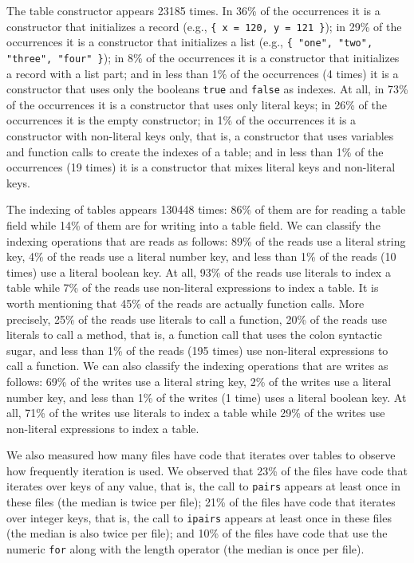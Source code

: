 The table constructor appears 23185 times.
In 36\% of the occurrences it is a constructor that initializes a
record (e.g., \texttt{\{ x = 120, y = 121 \}});
in 29\% of the occurrences it is a constructor that initializes a
list (e.g., \texttt{\{ "one", "two", "three", "four" \}});
in 8\% of the occurrences it is a constructor that initializes a
record with a list part;
and in less than 1\% of the occurrences (4 times) it is a constructor
that uses only the booleans \texttt{true} and \texttt{false} as indexes.
At all, in 73\% of the occurrences it is a constructor that uses
only literal keys;
in 26\% of the occurrences it is the empty constructor;
in 1\% of the occurrences it is a constructor with non-literal keys
only, that is, a constructor that uses variables and function calls
to create the indexes of a table;
and in less than 1\% of the occurrences (19 times) it is a constructor
that mixes literal keys and non-literal keys.

The indexing of tables appears 130448 times:
86\% of them are for reading a table field while
14\% of them are for writing into a table field.
We can classify the indexing operations that are reads as follows:
89\% of the reads use a literal string key,
4\% of the reads use a literal number key,
and less than 1\% of the reads (10 times) use a literal boolean key.
At all, 93\% of the reads use literals to index a table while
7\% of the reads use non-literal expressions to index a table.
It is worth mentioning that 45\% of the reads are actually
function calls.
More precisely, 25\% of the reads use literals to call a function,
20\% of the reads use literals to call a method, that is,
a function call that uses the colon syntactic sugar, 
and less than 1\% of the reads (195 times) use non-literal expressions
to call a function.
We can also classify the indexing operations that are writes as follows: 
69\% of the writes use a literal string key,
2\% of the writes use a literal number key,
and less than 1\% of the writes (1 time) uses a literal boolean key.
At all, 71\% of the writes use literals to index a table while
29\% of the writes use non-literal expressions to index a table.

We also measured how many files have code that iterates over tables to
observe how frequently iteration is used.
We observed that 23\% of the files have code that iterates over keys
of any value, that is, the call to \texttt{pairs} appears at least
once in these files (the median is twice per file);
21\% of the files have code that iterates over integer keys, that is,
the call to \texttt{ipairs} appears at least once in these files
(the median is also twice per file);
and 10\% of the files have code that use the numeric \texttt{for}
along with the length operator (the median is once per file).

